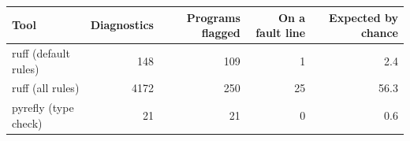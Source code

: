 \begin{tabular}{lrrrr}
\toprule
Tool & Diagnostics & Programs flagged & On a fault line & Expected by chance \\
\midrule
ruff (default rules) & 148 & 109 & 1 & 2.4 \\
ruff (all rules) & 4172 & 250 & 25 & 56.3 \\
pyrefly (type check) & 21 & 21 & 0 & 0.6 \\
\bottomrule
\end{tabular}
